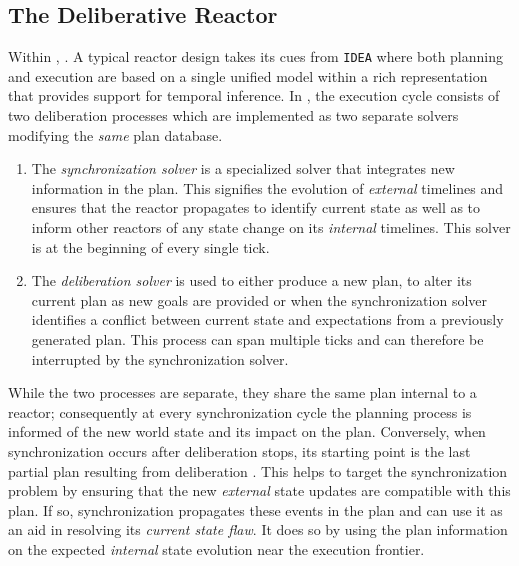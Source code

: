 \subsection{The  Deliberative Reactor}
\label{sec:arch:europa}

Within \rxe, . A typical reactor design takes its cues
from \texttt{IDEA} \cite{mus02, mus06} where both planning and
execution are based on a single unified model within a rich
representation that provides support for temporal inference. In \rxe,
the execution cycle consists of two deliberation processes which are
implemented as two separate \eu solvers modifying the \emph{same} plan
database.

\begin{enumerate}

\item The \emph{synchronization solver} is a specialized \eu solver
  that integrates new information in the plan. This signifies the
  evolution of \emph{external} timelines and ensures that the reactor
  propagates  to identify current state as well as
  to inform other reactors of any state change on its \emph{internal}
  timelines. This solver is  at the beginning of
  every single tick.

\item The \emph{deliberation solver} is used to either produce a new
  plan, to alter its current plan as new goals are provided or when
  the synchronization solver identifies a conflict between current
  state and expectations from a previously generated plan. This
  process can span multiple ticks and can therefore be interrupted by
  the synchronization solver.

\end{enumerate}

While the two processes are separate, they share the same plan
internal to a reactor; consequently at every synchronization cycle the
planning process is informed of the new world state and its impact on
the plan. Conversely, when synchronization occurs after deliberation
stops, its starting point is the last partial plan resulting from
deliberation . This
helps to target the synchronization problem by ensuring that the new
{\em external} state updates are compatible with this plan. If so,
synchronization propagates these events in the plan and can use it as
an aid in resolving its {\em current state flaw}. It does so by using
the plan information on the expected {\em internal} state evolution
near the execution frontier.


